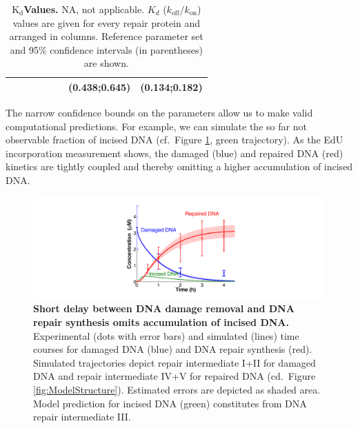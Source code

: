 \begin{table}[t]
\begin{adjustwidth}{-1 cm}{}
{\begin{tabular}{p{2cm}ccccccc}
	&                               &                              &                           &                          &                            &  (0.438;0.645)  & (0.134;0.182)  \\
	\hline
\end{tabular}}
\caption{\textbf{$\text{K}_{\text{d}}$Values.} NA, not applicable. $K_d$ ($k_{\text{off}}/k_{\text{on}}$) values are given for every repair protein and arranged in columns. Reference parameter set and 95\% confidence intervals (in parentheses) are shown.}\label{tab:KdValues}
\end{adjustwidth}
\end{table}

The narrow confidence bounds on the parameters allow us to make valid computational predictions. For example, we can simulate the so far not observable fraction of incised DNA (cf.\ Figure \ref{fig:ModelFit_intermed}, green trajectory). As the EdU incorporation measurement shows, the damaged (blue) and repaired DNA (red) kinetics are tightly coupled and thereby omitting a higher accumulation of incised DNA. 

\begin{figure}[htbp]
	\begin{center}
		\includegraphics[width=1\textwidth]{Abbildungen/figure2_7.pdf}
		\caption{\textbf{Short delay between DNA damage removal and DNA repair synthesis omits accumulation of incised DNA.} Experimental (dots with error bars) and simulated (lines) time courses for damaged DNA (blue) and DNA repair synthesis (red). Simulated trajectories depict repair intermediate I+II for damaged DNA and repair intermediate IV+V for repaired DNA (cd.\ Figure \ref{fig:ModelStructure}). Estimated errors are depicted as shaded area. Model prediction for incised DNA (green) constitutes from DNA repair intermediate III. }
		\label{fig:ModelFit_intermed}
	\end{center}
\end{figure}


  